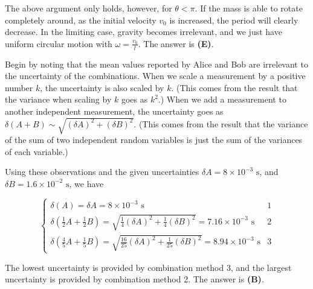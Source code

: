\documentclass[12pt]{article}
\begin{document}
The above argument only holds, however, for $\theta < \pi$. If the mass is able to rotate completely around, as the initial velocity $v_0$ is increased, the period will clearly decrease. In the limiting case, gravity becomes irrelevant, and we just have uniform circular motion with $\omega = \frac{v_0}{l}$. The answer is \textbf{(E)}.


\vspace{2 \baselineskip}



Begin by noting that the mean values reported by Alice and Bob are irrelevant to the uncertainty of the combinations. When we scale a measurement by a positive number $k$, the uncertainty is also scaled by $k$. (This comes from the result that the variance when scaling by $k$ goes as $k^2$.) When we add a measurement to another independent measurement, the uncertainty goes as $\delta (A + B) \sim \sqrt{(\delta A)^2 + (\delta B)^2}$. (This comes from the result that the variance of the sum of two independent random variables is just the sum of the variances of each variable.)

Using these observations and the given uncertainties $\delta A = 8 \times 10^{-3} \text{ s}$, and $\delta B = 1.6 \times 10^{-2} \text{ s}$, we have

$$\begin{cases}
\delta (A) = \delta A = 8 \times 10^{-3} \text{ s} & 1 \\
\delta \left( \frac{1}{2} A + \frac{1}{2} B \right) = \sqrt{\frac{1}{4} (\delta A)^2 + \frac{1}{4} (\delta B)^2} = 7.16 \times 10^{-3} \text{ s} & 2 \\
\delta \left( \frac{4}{5} A + \frac{1}{5} B \right) = \sqrt{\frac{16}{25} (\delta A)^2 + \frac{1}{25} (\delta B)^2} = 8.94 \times 10^{-3} \text{ s} & 3
\end{cases}$$

The lowest uncertainty is provided by combination method 3, and the largest uncertainty is provided by combination method 2. The answer is \textbf{(B)}.
\end{document}

